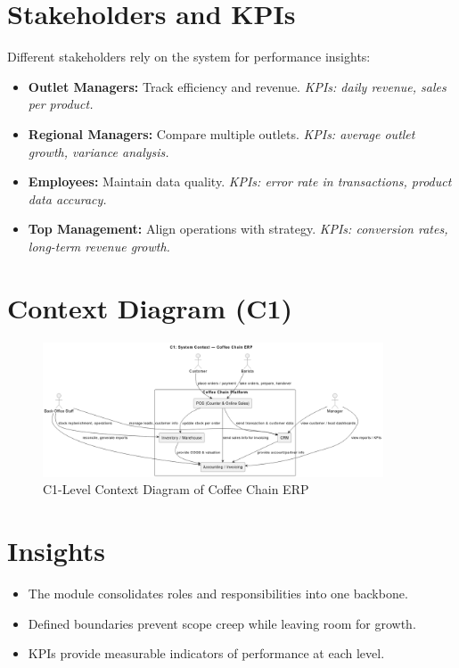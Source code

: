 \section*{Stakeholders and KPIs}
Different stakeholders rely on the system for performance insights:
\begin{itemize}
    \item \textbf{Outlet Managers:} Track efficiency and revenue.  
          \textit{KPIs: daily revenue, sales per product.}
    \item \textbf{Regional Managers:} Compare multiple outlets.  
          \textit{KPIs: average outlet growth, variance analysis.}
    \item \textbf{Employees:} Maintain data quality.  
          \textit{KPIs: error rate in transactions, product data accuracy.}
    \item \textbf{Top Management:} Align operations with strategy.  
          \textit{KPIs: conversion rates, long-term revenue growth.}
\end{itemize}

\section*{Context Diagram (C1)}
\begin{figure}[H]
\centering
\includegraphics[width=0.9\textwidth,keepaspectratio]{diagrams/context.png}
\caption{C1-Level Context Diagram of Coffee Chain ERP}
\end{figure}

\section*{Insights}
\begin{itemize}
    \item The module consolidates roles and responsibilities into one backbone.  
    \item Defined boundaries prevent scope creep while leaving room for growth.  
    \item KPIs provide measurable indicators of performance at each level.  
\end{itemize}
